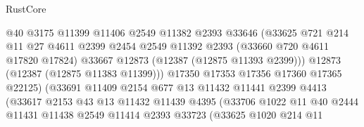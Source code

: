 \begin{lexlean}{RustCore}
\begin{coremodule}
                                  @40
                                  @3175
                                  @11399
                                  @11406
                                  @2549
                                  @11382
                                  @2393
                                  @33646
                                  (@33625
                                    @721
                                    @214
                                    @11
                                    @27
                                    @4611
                                    @2399
                                    @2454
                                    @2549
                                    @11392
                                    @2393
                                    (@33660 @720 @4611 @17820 @17824)
                                    @33667
                                    @12873
                                    (@12387 (@12875 @11393 @2399)))
                                  @12873
                                  (@12387 (@12875 @11383 @11399)))
                                @17350
                                @17353
                                @17356
                                @17360
                                @17365
                                @22125)
                              (@33691
                                @11409
                                @2154
                                @677
                                @13
                                @11432
                                @11441
                                @2399
                                @4413
                                (@33617
                                  @2153
                                  @43
                                  @13
                                  @11432
                                  @11439
                                  @4395
                                  (@33706
                                    @1022
                                    @11
                                    @40
                                    @2444
                                    @11431
                                    @11438
                                    @2549
                                    @11414
                                    @2393
                                    @33723
                                    (@33625
                                      @1020
                                      @214
                                      @11

\end{coremodule}
\end{lexlean}
